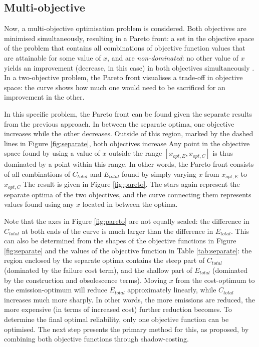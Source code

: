 \subsection{Multi-objective}

Now, a multi-objective optimisation problem is considered.
Both objectives are minimised simultaneously, resulting in a Pareto front: a set in the objective space of the problem that contains all combinations of objective function values that are attainable for some value of $x$, and are \emph{non-dominated}: no other value of $x$ yields an improvement (decrease, in this case) in both objectives simultaneously \citep{Deb2001Multi-objectiveAlgorithms, Martins2021EngineeringOptimization}.
In a two-objective problem, the Pareto front visualises a trade-off in objective space: the curve shows how much one would need to be sacrificed for an improvement in the other.

In this specific problem, the Pareto front can be found given the separate results from the previous approach. 
In between the separate optima, one objective increases while the other decreases.
Outside of this region, marked by the dashed lines in Figure \ref{fig:separate}, both objectives increase
Any point in the objective space found by using a value of $x$ outside the range $[x_{opt,E},x_{opt,C}]$ is thus dominated by a point within this range.
In other words, the Pareto front consists of all combinations of $C_{total}$ and $E_{total}$ found by simply varying $x$ from $x_{opt,E}$ to $x_{opt,C}$
The result is given in Figure \ref{fig:pareto}.
The stars again represent the separate optima of the two objectives, and the curve connecting them represents values found using any $x$ located in between the optima.

Note that the axes in Figure \ref{fig:pareto} are not equally scaled: the difference in $C_{total}$ at both ends of the curve is much larger than the difference in $E_{total}$.
This can also be determined from the shapes of the objective functions in Figure \ref{fig:separate} and the values of the objective function in Table \ref{tab:separate}: the region enclosed by the separate optima contains the steep part of $C_{total}$ (dominated by the failure cost term), and the shallow part of $E_{total}$ (dominated by the construction and obsolescence terms).
Moving $x$ from the cost-optimum to the emission-optimum will reduce $E_{total}$ approximately linearly, while $C_{total}$ increases much more sharply.
In other words, the more emissions are reduced, the more expensive (in terms of increased cost) further reduction becomes.
To determine the final optimal reliability, only one objective function can be optimised.
The next step presents the primary method for this, as proposed, by combining both objective functions through shadow-costing.


